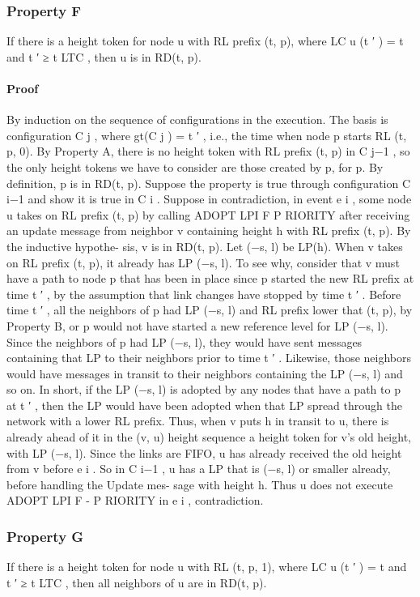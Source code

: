 \documentclass{article}
\begin{document}
\subsubsection{Property F}
If there is a height token for node u with RL
prefix (t, p), where LC u (t ′ ) = t and t ′ ≥ t LTC , then u is in RD(t, p).\\
\paragraph{Proof}
By induction on the sequence of configurations in
the execution.
The basis is configuration C j , where gt(C j ) = t ′ , i.e., the
time when node p starts RL (t, p, 0). By Property A, there
is no height token with RL prefix (t, p) in C j−1 , so the only
height tokens we have to consider are those created by p,
for p. By definition, p is in RD(t, p).
Suppose the property is true through configuration C i−1
and show it is true in C i .
Suppose in contradiction, in event e i , some node u takes
on RL prefix (t, p) by calling ADOPT LPI F P RIORITY after
receiving an update message from neighbor v containing
height h with RL prefix (t, p). By the inductive hypothe-
sis, v is in RD(t, p).
Let (−s, l) be LP(h). When v takes on RL prefix (t, p),
it already has LP (−s, l). To see why, consider that v must
have a path to node p that has been in place since p started
the new RL prefix at time t ′ , by the assumption that link
changes have stopped by time t ′ . Before time t ′ , all the
neighbors of p had LP (−s, l) and RL prefix lower that
(t, p), by Property B, or p would not have started a new
reference level for LP (−s, l). Since the neighbors of p
had LP (−s, l), they would have sent messages containing
that LP to their neighbors prior to time t ′ . Likewise, those
neighbors would have messages in transit to their neighbors
containing the LP (−s, l) and so on. In short, if the LP
(−s, l) is adopted by any nodes that have a path to p at t ′ ,
then the LP would have been adopted when that LP spread
through the network with a lower RL prefix. Thus, when v
puts h in transit to u, there is already ahead of it in the (v, u)
height sequence a height token for v’s old height, with LP
(−s, l). Since the links are FIFO, u has already received the
old height from v before e i . So in C i−1 , u has a LP that is
(−s, l) or smaller already, before handling the Update mes-
sage with height h. Thus u does not execute ADOPT LPI F -
P RIORITY in e i , contradiction.

\subsubsection{Property G}
If there is a height token for node u with RL
(t, p, 1), where LC u (t ′ ) = t and t ′ ≥ t LTC , then all neighbors
of u are in RD(t, p).\\
\end{document}
